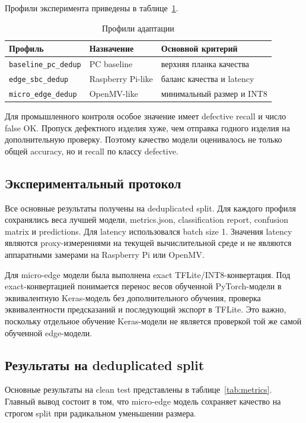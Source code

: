 \documentclass[12pt,a4paper]{article}
\begin{document}
Профили эксперимента приведены в таблице~\ref{tab:profiles}.

\begin{table}[H]
\centering
\caption{Профили адаптации}
\label{tab:profiles}
\begin{tabular}{lll}
\toprule
Профиль & Назначение & Основной критерий \\
\midrule
\texttt{baseline\_pc\_dedup} & PC baseline & верхняя планка качества \\
\texttt{edge\_sbc\_dedup} & Raspberry Pi-like & баланс качества и latency \\
\texttt{micro\_edge\_dedup} & OpenMV-like & минимальный размер и INT8 \\
\bottomrule
\end{tabular}
\end{table}

Для промышленного контроля особое значение имеет defective recall и число false OK. Пропуск дефектного изделия хуже, чем отправка годного изделия на дополнительную проверку. Поэтому качество модели оценивалось не только общей accuracy, но и recall по классу defective.

\subsection{Экспериментальный протокол}

Все основные результаты получены на deduplicated split. Для каждого профиля сохранялись веса лучшей модели, metrics.json, classification report, confusion matrix и predictions. Для latency использовался batch size 1. Значения latency являются proxy-измерениями на текущей вычислительной среде и не являются аппаратными замерами на Raspberry Pi или OpenMV.

Для micro-edge модели была выполнена exact TFLite/INT8-конвертация. Под exact-конвертацией понимается перенос весов обученной PyTorch-модели в эквивалентную Keras-модель без дополнительного обучения, проверка эквивалентности предсказаний и последующий экспорт в TFLite. Это важно, поскольку отдельное обучение Keras-модели не является проверкой той же самой обученной edge-модели.

\subsection{Результаты на deduplicated split}

Основные результаты на clean test представлены в таблице~\ref{tab:metrics}. Главный вывод состоит в том, что micro-edge модель сохраняет качество на строгом split при радикальном уменьшении размера.
\end{document}
